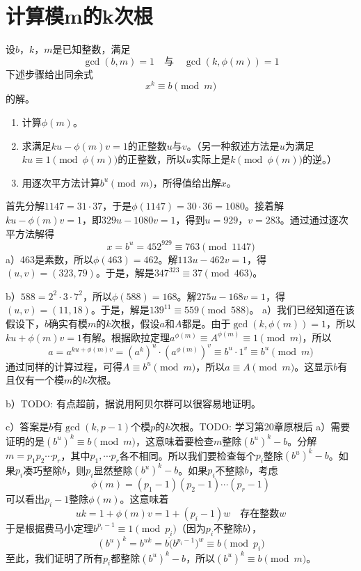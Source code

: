 \chapter{计算模m的k次根}
\begin{algorithm}[如何计算模$m$的$k$次根]
设$b$，$k$，$m$是已知整数，满足
\[\gcd(b, m)=1\quad\text{与}\quad \gcd(k,\phi(m))=1\]
下述步骤给出同余式
\[x^k\equiv b\pmod m\]
的解。
\begin{enumerate}
\item 计算$\phi(m)$。
\item 求满足$ku-\phi(m)v=1$的正整数$u$与$v$。（另一种叙述方法是$u$为满足$ku\equiv 1\pmod{\phi(m)}$的正整数，所以$u$实际上是$k\pmod{\phi(m)}$的逆。）
\item 用逐次平方法计算$b^u\pmod{m}$，所得值给出解$x$。
\end{enumerate}
\end{algorithm}
%
\exercise 首先分解$1147=31\cdot37$，于是$\phi(1147)=30\cdot36=1080$。接着解$ku-\phi(m)v=1$，即$329u-1080v=1$，得到$u=929$，$v=283$。通过通过逐次平方法解得
\[x=b^u=452^{929}\equiv763\pmod{1147}\]
%
\exercise a）463是素数，所以$\phi(463)=462$。解$113u-462v=1$，得$(u,v)=(323,79)$。于是，解是$347^{323}\equiv 37\pmod{463}$。\par
b）$588=2^2\cdot3\cdot7^2$，所以$\phi(588)=168$。解$275u-168v=1$，得$(u,v)=(11,18)$。于是，解是$139^{11}\equiv 559\pmod{588}$。
%
\exercise a）我们已经知道在该假设下，$b$确实有模$m$的$k$次根，假设$a$和$A$都是。由于$\gcd(k,\phi(m))=1$，所以$ku+\phi(m)v=1$有解。根据欧拉定理$a^{\phi(m)}\equiv A^{\phi(m)}\equiv 1\pmod m$，所以
\[a=a^{ku+\phi(m)v}=(a^k)^u\cdot\left(a^{\phi(m)}\right)^v\equiv b^u\cdot 1^v\equiv b^u\pmod m\]
通过同样的计算过程，可得$A\equiv b^u\pmod m$，所以$a\equiv A\pmod m$。这显示$b$有且仅有一个模$m$的$k$次根。\par
b）TODO: 有点超前，据说用阿贝尔群可以很容易地证明。\par
c）答案是$b$有$\gcd(k, p-1)$个模$p$的$k$次根。TODO: 学习第20章原根后
%
\exercise a）需要证明的是$(b^u)^k\equiv b\pmod m$，这意味着要检查$m$整除$(b^u)^k -b$。分解$m=p_1p_2\cdots p_r$，其中$p_1,\cdots p_r$各不相同。所以我们要检查每个$p_i$整除$(b^u)^k -b$。如果$p_i$凑巧整除$b$，则$p_i$显然整除$(b^u)^k -b$。如果$p_i$不整除$b$，考虑
\[\phi(m)=(p_1-1)(p_2-1)\cdots(p_r-1)\]
可以看出$p_i-1$整除$\phi(m)$。这意味着
\[uk=1+\phi(m)v=1+(p_i-1)w\quad \text{存在整数$w$}\]
于是根据费马小定理$b^{p_i-1}\equiv 1\pmod{p_i}$（因为$p_i$不整除$b$），
\[(b^u)^k=b^{uk}=b\dot(b^{p_i-1})^w\equiv b\pmod{p_i}\]
至此，我们证明了所有$p_i$都整除$(b^u)^k -b$，所以$(b^u)^k\equiv b\pmod m$。\par
